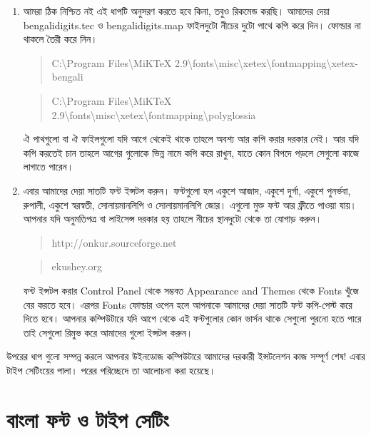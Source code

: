 \begin{enumerate}
\item আমরা ঠিক নিশ্চিত নই এই ধাপটি অনুসরণ করতে হবে কিনা, তবুও রিকমেন্ড করছি। আমাদের দেয়া bengalidigits.tec ও bengalidigits.map ফাইলদুটো নীচের দুটো পাথে কপি করে দিন।  ফোল্ডার না থাকলে তৈরী করে নিন।
\begin{scriptsize}\begin{quote}‌C:\textbackslash{}Program Files\textbackslash{}MiKTeX 2.9\textbackslash{}fonts\textbackslash{}misc\textbackslash{}xetex\textbackslash{}fontmapping\textbackslash{}xetex-bengali\end{quote}\end{scriptsize}\begin{scriptsize}\begin{quote}C:\textbackslash{}Program Files\textbackslash{}MiKTeX 2.9\textbackslash{}fonts\textbackslash{}misc\textbackslash{}xetex\textbackslash{}fontmapping\textbackslash{}polyglossia\end{quote}\end{scriptsize}
ঐ পাথগুলো বা ঐ ফাইলগুলো যদি আগে থেকেই থাকে তাহলে অবশ্য আর কপি করার দরকার নেই। আর যদি কপি করতেই চান তাহলে আগের গুলোকে ভিন্ন নামে কপি করে রাখুন, যাতে কোন বিপদে পড়লে সেগুলো কাজে লাগাতে পারেন।

\item এবার আমাদের দেয়া সাতটি ফন্ট ইন্সটল করুন। ফন্টগুলো হল একুশে আজাদ, একুশে দুর্গা, একুশে পুনর্ভবা, রুপালী, একুশে স্বরস্বতী, সোলায়মানলিপি ও সোলায়মানলিপি জোর। এগুলো মুক্ত ফন্ট আর ফ্রীতে পাওয়া যায়। আপনার যদি অনুমতিপত্র বা লাইসেন্স দরকার হয় তাহলে নীচের স্থানদুটো থেকে তা যোগাড় করুন। ‌\begin{quote}http://onkur.sourceforge.net\end{quote}\begin{quote}ekushey.org\end{quote} ফন্ট ইন্সটল করার Control Panel থেকে সম্ভবত Appearance and Themes থেকে Fonts খুঁজে বের করতে হবে। এরপর Fonts ফোল্ডার ওপেন হলে আপনাকে আমাদের দেয়া সাতটি ফন্ট কপি-পেস্ট করে দিতে হবে। আপনার কম্পিউটারে যদি আগে থেকে এই ফন্টগুলোর কোন ভার্সন থাকে সেগুলো পুরনো হতে পারে তাই সেগুলো রিমুভ করে আমাদের গুলো ইন্সটল করুন। 
\end{enumerate}

উপরের ধাপ গুলো সম্পন্ন করলে আপনার উইনডোজ কম্পিউটারে আমাদের দরকারী ইন্সটলেশন কাজ সম্পূর্ণ শেষ! এবার টাইপ সেটিংয়ের পালা। পরের পরিচ্ছেদে তা আলোচনা করা হয়েছে।


\section{বাংলা ফন্ট ও টাইপ সেটিং}

